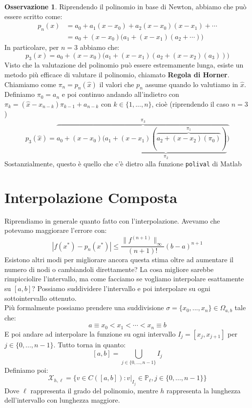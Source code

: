 \documentclass[11pt,a4paper,twoside]{article}
\theoremstyle{definition}
\newtheorem*{oss}{Osservazione}
\begin{document}
\begin{oss}
	Riprendendo il polinomio in base di Newton, abbiamo che può essere scritto come:
	\begin{align*}
		p_n(x) &= a_0 + a_1(x-x_0) + a_2(x-x_0)(x-x_1) + \cdots\\
		&= a_0 + (x-x_0)\big( a_1 + (x-x_1) ( a_2 + \cdots) \big)
	\end{align*}
	In particolare, per $n= 3$ abbiamo che:
	\[ p_3(x) = a_0 + (x-x_0)\big( a_1  + (x-x_1) (a_2 + (x-x_2)(a_3)) \big)\]
	Visto che la valutazione del polinomio può essere estremamente lunga, esiste un metodo più efficace di valutare il polinomio, chiamato \textbf{Regola di Horner}.\\
	Chiamiamo come $\pi_n = p_n(\hat x)$ il valori che $p_n$ assume quando lo valutiamo in $\hat x$. Definiamo $\pi_0 = a_n$ e poi continuo andando all'indietro con $\pi_k = (\hat x - x_{n-k})\pi_{k-1} + a_{n-k}$ con $k \in \{1,...,n\}$, cioè (riprendendo il caso $n = 3$)
	\[ p_3(\hat x) = \overbrace{a_0 + (x-x_0)\big( \underbrace{a_1 + (x-x_1)(\overbrace{a_2 + (x-x_2)(\pi_0)}^{\pi_1})}_{\pi_2} \big)}^{\pi_3} \]
	Sostanzialmente, questo è quello che c'è dietro alla funzione \texttt{polival} di Matlab
\end{oss}

\newpage

\section{Interpolazione Composta}

Riprendiamo in generale quanto fatto con l'interpolazione. Avevamo che potevamo maggiorare l'errore con:
\[ |f(x^*) - p_n(x^*)| \leq \frac{\|f^{(n+1)}\|_\infty}{(n+1)!}(b-a)^{n+1} \]
Esistono altri modi per migliorare ancora questa stima oltre ad aumentare il numero di nodi o cambiandoli direttamente?
La cosa migliore sarebbe rimpicciolire l'intervallo, ma come facciamo se vogliamo interpolare esattamente su $[a,b]$?
Possiamo suddividere l'intervallo e poi interpolare su ogni sottointervallo ottenuto.\\
Più formalmente possiamo prendere una suddivisione $\sigma = \{x_0,...,x_n\}\in \Omega_{a,b}$ tale che:
\[ a \equiv x_0 < x_1 < \cdots < x_n \equiv b\]
E poi andare ad interpolare la funzione su ogni intervallo $I_j = [x_j, x_{j+1}]$ per $j \in \{0,...,n-1\}$. Tutto torna in quanto:
\[ [a,b] = \bigcup_{j \in \{0,...,n-1\}} I_j\]
Definiamo poi:
\[ \mathcal X_{h,\ell} = \{v \in C([a,b]) : v|_{I_j} \in \mathbb P_\ell, j \in \{0,...,n-1\}\}\]
Dove $\ell$ rappresenta il grado del polinomio, mentre $h$ rappresenta la lunghezza dell'intervallo con lunghezza maggiore.
\end{document}
